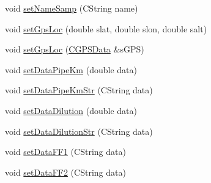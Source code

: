 \begin{DoxyCompactItemize}
\item 
void \hyperlink{classCCustomerInfoData_abcef72ac95e8806a780c8bb5d828706c}{setNameSamp} (CString name)
\item 
void \hyperlink{classCCustomerInfoData_af7fcb14bd38174cad5b75f28902a459c}{setGpsLoc} (double slat, double slon, double salt)
\item 
void \hyperlink{classCCustomerInfoData_a33ff24ec471cdb508c90a16923f3f024}{setGpsLoc} (\hyperlink{classCGPSData}{CGPSData} \&sGPS)
\item 
void \hyperlink{classCCustomerInfoData_a1d2b27041c50b9d9121529fc5fd5e220}{setDataPipeKm} (double data)
\item 
void \hyperlink{classCCustomerInfoData_a4640f9ff0e67ab173b763a6994ec6ac1}{setDataPipeKmStr} (CString data)
\item 
void \hyperlink{classCCustomerInfoData_a604518a314a72578a2384a6571dd6bb2}{setDataDilution} (double data)
\item 
void \hyperlink{classCCustomerInfoData_abc04bfff4ca279bf0fb0cdfa07300819}{setDataDilutionStr} (CString data)
\item 
void \hyperlink{classCCustomerInfoData_ac6ae25cad62ebcb3acb45005fbc467cc}{setDataFF1} (CString data)
\item 
void \hyperlink{classCCustomerInfoData_a39e7f0e44d029ca8108dc1359c488a6a}{setDataFF2} (CString data)
\end{DoxyCompactItemize}
